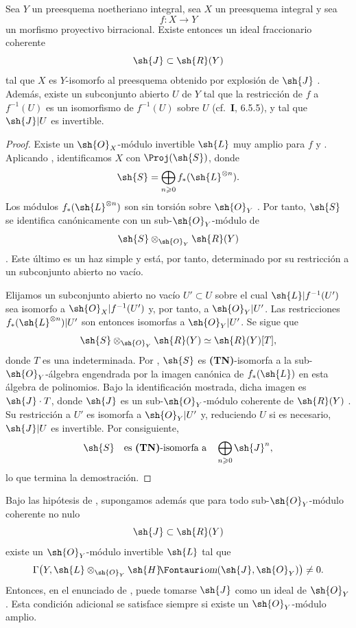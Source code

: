 \documentclass[oneside]{amsart}
\makeatletter
\renewcommand{\geq}{\geqslant}
\newcommand*{\ega@sheafop}[3]{\sh{#1}#2\textup{\kern-2.2pt{\Fontauri\slshape #3}}}
\newcommand*{\shHom}{\ega@sheafop{H}{}{om}}
\newcommand{\oldpage}[2][]{{\marginnote{\normalfont\textbf{#1}~|~#2}}\ignorespaces}
\let\EGAOriginalLabel\label
\renewcommand{\label}[1]{\phantomsection\EGAOriginalLabel{#1}}
\makeatother
\begin{document}
\oldpage[III]{106}
\begin{proposition}[2.3.5]
\label{III.2.3.5}
Sea $Y$ un preesquema noetheriano integral, sea $X$ un preesquema integral y sea
\[
  f:X\longrightarrow Y
\]
un morfismo \textup{proyectivo birracional}.
Existe entonces un ideal fraccionario coherente
\[
  \sh{J}\subset\sh{R}(Y)
\]
\textup{} tal que $X$ es $Y$-isomorfo al preesquema obtenido por explosión de $\sh{J}$ \textup{}.
Además, existe un subconjunto abierto $U$ de $Y$ tal que la restricción de $f$ a $f^{-1}(U)$ es un isomorfismo de $f^{-1}(U)$ sobre $U$ \textup{(cf.\ \textbf{I}, 6.5.5)}, y tal que $\sh{J}|U$ es invertible.
\end{proposition}

\begin{proof}
Existe un $\sh{O}_X$-módulo invertible $\sh{L}$ muy amplio para $f$  y .
Aplicando , identificamos $X$ con $\Proj(\sh{S})$, donde
\[
  \sh{S}=\bigoplus_{n\geq0}f_*(\sh{L}^{\otimes n}).
\]
Los módulos $f_*(\sh{L}^{\otimes n})$ son sin torsión sobre $\sh{O}_Y$ .
Por tanto, $\sh{S}$ se identifica canónicamente con un sub-$\sh{O}_Y$-módulo de
\[
  \sh{S}\otimes_{\sh{O}_Y}\sh{R}(Y)
\]
.
Este último es un haz simple  y está, por tanto, determinado por su restricción a un subconjunto abierto no vacío.

Elijamos un subconjunto abierto no vacío $U'\subset U$ sobre el cual $\sh{L}|f^{-1}(U')$ sea isomorfo a $\sh{O}_X|f^{-1}(U')$ y, por tanto, a $\sh{O}_Y|U'$.
Las restricciones $f_*(\sh{L}^{\otimes n})|U'$ son entonces isomorfas a $\sh{O}_Y|U'$.
Se sigue que
\[
  \sh{S}\otimes_{\sh{O}_Y}\sh{R}(Y)
  \simeq\sh{R}(Y)[T],
\]
donde $T$ es una indeterminada.
Por , $\sh{S}$ es \textbf{(TN)}-isomorfa a la sub-$\sh{O}_Y$-álgebra engendrada por la imagen canónica de $f_*(\sh{L})$ en esta álgebra de polinomios.
Bajo la identificación mostrada, dicha imagen es $\sh{J}\cdot T$, donde $\sh{J}$ es un sub-$\sh{O}_Y$-módulo coherente de $\sh{R}(Y)$ .
Su restricción a $U'$ es isomorfa a $\sh{O}_Y|U'$ y, reduciendo $U$ si es necesario, $\sh{J}|U$ es invertible.
Por consiguiente,
\[
  \sh{S}\quad\text{es \textbf{(TN)}-isomorfa a}\quad
  \bigoplus_{n\geq0}\sh{J}^n,
\]
lo que termina la demostración.
\end{proof}

\begin{corollary}[2.3.6]
\label{III.2.3.6}
Bajo las hipótesis de \textup{}, supongamos además que para todo sub-$\sh{O}_Y$-módulo coherente no nulo
\[
  \sh{J}\subset\sh{R}(Y)
\]
existe un $\sh{O}_Y$-módulo invertible $\sh{L}$ tal que
\[
  \Gamma\bigl(Y,\sh{L}\otimes_{\sh{O}_Y}
  \shHom(\sh{J},\sh{O}_Y)\bigr)\neq0.
\]
Entonces, en el enunciado de \textup{}, puede tomarse $\sh{J}$ como un ideal de $\sh{O}_Y$.
Esta condición adicional se satisface siempre si existe un $\sh{O}_Y$-módulo amplio.
\end{corollary}
\end{document}
